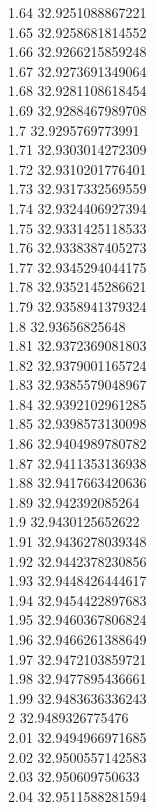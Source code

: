 {1.64	32.9251088867221\\
1.65	32.9258681814552\\
1.66	32.9266215859248\\
1.67	32.9273691349064\\
1.68	32.9281108618454\\
1.69	32.9288467989708\\
1.7	32.9295769773991\\
1.71	32.9303014272309\\
1.72	32.9310201776401\\
1.73	32.9317332569559\\
1.74	32.9324406927394\\
1.75	32.9331425118533\\
1.76	32.9338387405273\\
1.77	32.9345294044175\\
1.78	32.9352145286621\\
1.79	32.9358941379324\\
1.8	32.93656825648\\
1.81	32.9372369081803\\
1.82	32.9379001165724\\
1.83	32.9385579048967\\
1.84	32.9392102961285\\
1.85	32.9398573130098\\
1.86	32.9404989780782\\
1.87	32.9411353136938\\
1.88	32.9417663420636\\
1.89	32.942392085264\\
1.9	32.9430125652622\\
1.91	32.9436278039348\\
1.92	32.9442378230856\\
1.93	32.9448426444617\\
1.94	32.9454422897683\\
1.95	32.9460367806824\\
1.96	32.9466261388649\\
1.97	32.9472103859721\\
1.98	32.9477895436661\\
1.99	32.9483636336243\\
2	32.9489326775476\\
2.01	32.9494966971685\\
2.02	32.9500557142583\\
2.03	32.950609750633\\
2.04	32.9511588281594\\
}
